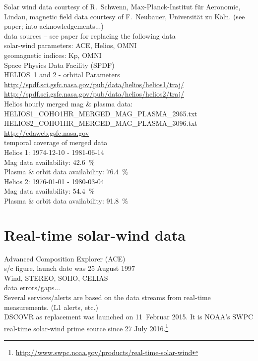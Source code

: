 Solar wind data courtesy of R.~Schwenn, Max-Planck-Institut für Aeronomie, Lindau, magnetic field data courtesy of F.~Neubauer, Universität zu Köln. (see paper; into acknowledgements...)\\




data sources -- see paper for replacing the following data\\
solar-wind parameters: ACE, Helios, OMNI\\
geomagnetic indices: Kp, OMNI\\

Space Physics Data Facility (SPDF)\\

HELIOS~1 and 2 - orbital Parameters\\
\url{http://spdf.sci.gsfc.nasa.gov/pub/data/helios/helios1/traj/}\\
\url{http://spdf.sci.gsfc.nasa.gov/pub/data/helios/helios2/traj/}\\

Helios hourly merged mag \& plasma data:\\
HELIOS1\_COHO1HR\_MERGED\_MAG\_PLASMA\_2965.txt\\
HELIOS2\_COHO1HR\_MERGED\_MAG\_PLASMA\_3096.txt\\
\url{http://cdaweb.gsfc.nasa.gov}\\
temporal coverage of merged data\\
Helios 1: 1974-12-10 - 1981-06-14\\
Mag data availability: 42.6~\%\\
Plasma \& orbit data availability: 76.4~\%\\
Helios 2: 1976-01-01 - 1980-03-04\\
Mag data availability: 54.4~\%\\
Plasma \& orbit data availability: 91.8~\%\\


\section{Real-time solar-wind data}

Advanced Composition Explorer (ACE)\\
s/c figure, launch date was 25 August 1997\\

Wind, STEREO, SOHO, CELIAS\\

data errors/gaps...\\
Several services/alerts are based on the data streams from real-time measurements. (L1 alerts, etc.)\\

DSCOVR as replacement was launched on 11~Februar 2015. It is NOAA's SWPC real-time solar-wind prime source since 27 July 2016.\footnote{\url{http://www.swpc.noaa.gov/products/real-time-solar-wind}}\\
